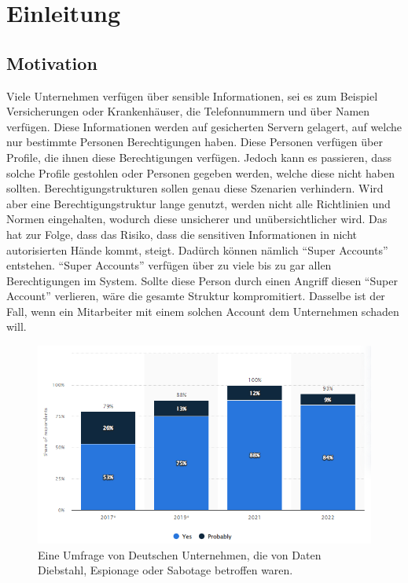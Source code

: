 \chapter{Einleitung}
\label{ch:intro}

\section{Motivation}
\label{sec:intro:motivation}
Viele Unternehmen verfügen über sensible Informationen, sei es zum Beispiel Versicherungen oder Krankenhäuser, die Telefonnummern und über Namen verfügen.
Diese Informationen werden auf gesicherten Servern gelagert, auf welche nur bestimmte Personen Berechtigungen haben.
Diese Personen verfügen über Profile, die ihnen diese Berechtigungen verfügen.
Jedoch kann es passieren, dass solche Profile gestohlen oder Personen gegeben werden, welche diese nicht haben sollten.
Berechtigungstrukturen sollen genau diese Szenarien verhindern.
Wird aber eine Berechtigungstruktur lange genutzt, werden nicht alle Richtlinien und Normen eingehalten, wodurch diese unsicherer und unübersichtlicher wird.
Das hat zur Folge, dass das Risiko, dass die sensitiven Informationen in nicht autorisierten Hände kommt, steigt.
Dadürch können nämlich "`Super Accounts"' entstehen.
"`Super Accounts"' verfügen über zu viele bis zu gar allen Berechtigungen im System.
Sollte diese Person durch einen Angriff diesen "`Super Account"' verlieren, wäre die gesamte Struktur kompromitiert.
Dasselbe ist der Fall, wenn ein Mitarbeiter mit einem solchen Account dem Unternehmen schaden will.

\begin{figure}[h!]
 \centering
 \includegraphics[width=1\textwidth]{gfx/Picture/Cyber_Crime.PNG}
 \caption{Eine Umfrage von Deutschen Unternehmen, die von Daten Diebstahl, Espionage oder Sabotage betroffen waren.\cite{Stat22}}
 \label{fig:Crime}
\end{figure}

